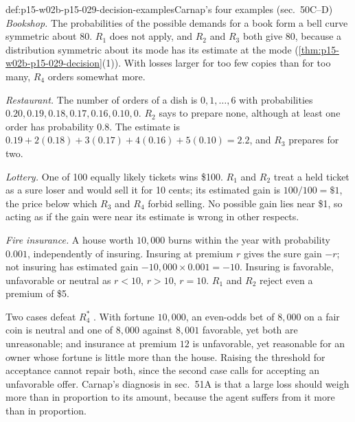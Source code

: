 \begin{hbexample}{def:p15-w02b-p15-029-decision-examples}{Carnap's four examples (sec.~50C--D)}
\emph{Bookshop.} The probabilities of the possible demands for a book
form a bell curve symmetric about 80. \(R_1\) does not apply, and
\(R_2\) and \(R_3\) both give 80, because a distribution symmetric
about its mode has its estimate at the mode
(\cref{thm:p15-w02b-p15-029-decision}(1)). With losses larger for
too few copies than for too many, \(R_4\) orders somewhat more.

\emph{Restaurant.} The number of orders of a dish is \(0,1,\ldots,6\)
with probabilities \(0.20, 0.19, 0.18, 0.17, 0.16, 0.10, 0\). \(R_2\)
says to prepare none, although at least one order has probability
\(0.8\). The estimate is
\(0.19+2(0.18)+3(0.17)+4(0.16)+5(0.10)=2.2\), and \(R_3\) prepares for
two.

\emph{Lottery.} One of 100 equally likely tickets wins \$100. \(R_1\)
and \(R_2\) treat a held ticket as a sure loser and would sell it for
10 cents; its estimated gain is \(100/100=\$1\), the price below which
\(R_3\) and \(R_4\) forbid selling. No possible gain lies near \$1, so
acting as if the gain were near its estimate is wrong in other respects.

\emph{Fire insurance.} A house worth \(10{,}000\) burns within the year
with probability \(0.001\), independently of insuring. Insuring at
premium \(r\) gives the sure gain \(-r\); not insuring has estimated
gain \(-10{,}000\times0.001=-10\). Insuring is favorable, unfavorable or
neutral as \(r<10\), \(r>10\), \(r=10\). \(R_1\) and \(R_2\) reject
even a premium of \$5.
\end{hbexample}

Two cases defeat \(R_4^*\) \cite[sec.~50E, pp.~262--264]{Carnap1950Probability}.
With fortune \(10{,}000\), an even-odds bet of \(8{,}000\) on a fair
coin is neutral and one of \(8{,}000\) against \(8{,}001\) favorable, yet
both are unreasonable; and insurance at premium \(12\) is unfavorable,
yet reasonable for an owner whose fortune is little more than the house.
Raising the threshold for acceptance cannot repair both, since the
second case calls for accepting an unfavorable offer. Carnap's diagnosis
in sec.~51A is that a large loss should weigh more than in proportion to
its amount, because the agent suffers from it more than in proportion.

